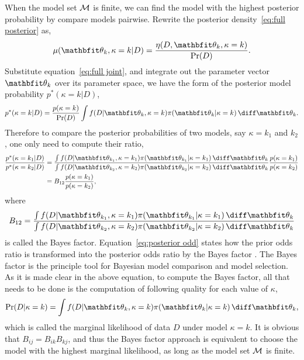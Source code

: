 \documentclass[11pt, hyper, bib, fontset=Minion]{marticle}
\begin{document}
When the model set $\mathcal{M}$ is finite, we can find the model with the highest
posterior probability by compare models pairwise. Rewrite the posterior
density~\eqref{eq:full posterior} as,
\begin{equation}
  \mu(\bth_k,\kappa=k|D) = \frac{\eta(D,\bth_k,\kappa=k)}{\Pr(D)}.
\end{equation}
Substitute equation~\eqref{eq:full joint}, and integrate out the parameter
vector $\bth_k$ over its parameter space, we have the form of the posterior
model probability $p^*(\kappa=k|D)$,
\begin{equation}
  p^*(\kappa=k|D) = \frac{p(\kappa = k)}{\Pr(D)}
  \int f(D|\bth_k,\kappa = k)\pi(\bth_k|\kappa = k)\dd\bth_k.
\end{equation}
Therefore to compare the posterior probabilities of two models, say $\kappa =
k_1$ and $k_2$, one only need to compute their ratio,
\begin{align}
  \frac{p^*(\kappa = k_1|D)}{p^*(\kappa = k_2|D)} &= \frac
  {\int f(D|\bth_{k_1},\kappa=k_1)\pi(\bth_{k_1}|\kappa=k_1)\dd\bth_k}
  {\int f(D|\bth_{k_2},\kappa=k_2)\pi(\bth_{k_2}|\kappa=k_2)\dd\bth_k}
  \frac{p(\kappa=k_1)}{p(\kappa=k_2)} \notag\\
  & = B_{12} \frac{p(\kappa=k_1)}{p(\kappa=k_2)},
  \label{eq:posterior odd}
\end{align}
where
\begin{equation}
  B_{12} = \frac
  {\int f(D|\bth_{k_1},\kappa=k_1)\pi(\bth_{k_1}|\kappa=k_1)\dd\bth_k}
  {\int f(D|\bth_{k_2},\kappa=k_2)\pi(\bth_{k_2}|\kappa=k_2)\dd\bth_k}
  \label{eq:bayes factor}
\end{equation}
is called the Bayes factor. Equation~\eqref{eq:posterior odd} states how the
prior odds ratio is transformed into the posterior odds ratio by the Bayes
factor \parencite{Kass:1995vb}. The Bayes factor is the principle tool for
Bayesian model comparison and model selection. As it is made clear in the
above equation, to compute the Bayes factor, all that needs to be done is the
computation of following quality for each value of $\kappa$,
\begin{equation}
  \Pr(D|\kappa = k)
  = \int f(D|\bth_k,\kappa=k)\pi(\bth_k|\kappa=k)\dd\bth_k,
  \label{eq:marginal likelihood}
\end{equation}
which is called the marginal likelihood of data $D$ under model $\kappa = k$.
It is obvious that $B_{ij} = B_{ik} B_{kj}$, and thus the Bayes factor
approach is equivalent to choose the model with the highest marginal
likelihood, as long as the model set $\mathcal{M}$ is finite.
\end{document}
